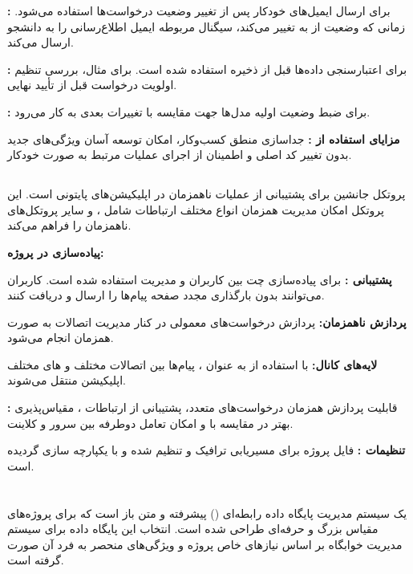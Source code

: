 \documentclass[12pt,a4paper]{report}
\begin{document}
	\textbf{:} برای ارسال ایمیل‌های خودکار پس از تغییر وضعیت درخواست‌ها استفاده می‌شود. زمانی که وضعیت  از  به  تغییر می‌کند، سیگنال مربوطه ایمیل اطلاع‌رسانی را به دانشجو ارسال می‌کند.
	
	\textbf{:} برای اعتبارسنجی داده‌ها قبل از ذخیره استفاده شده است. برای مثال، بررسی تنظیم اولویت درخواست قبل از تأیید نهایی.
	
	\textbf{:} برای ضبط وضعیت اولیه مدل‌ها جهت مقایسه با تغییرات بعدی به کار می‌رود.
	
	\textbf{مزایای استفاده از :} جداسازی منطق کسب‌وکار، امکان توسعه آسان ویژگی‌های جدید بدون تغییر کد اصلی و اطمینان از اجرای عملیات مرتبط به صورت خودکار.
	
	\subsection{}
	 پروتکل جانشین  برای پشتیبانی از عملیات ناهمزمان در اپلیکیشن‌های پایتونی است. این پروتکل امکان مدیریت همزمان انواع مختلف ارتباطات شامل ،  و سایر پروتکل‌های ناهمزمان را فراهم می‌کند.
	
	\textbf{پیاده‌سازی  در پروژه:}
	
	\textbf{پشتیبانی :} برای پیاده‌سازی چت  بین کاربران و مدیریت استفاده شده است. کاربران می‌توانند بدون بارگذاری مجدد صفحه پیام‌ها را ارسال و دریافت کنند.
	
	\textbf{پردازش ناهمزمان:} پردازش درخواست‌های  معمولی در کنار مدیریت اتصالات  به صورت همزمان انجام می‌شود.
	
	\textbf{لایه‌های کانال:} با استفاده از  به عنوان ، پیام‌ها بین اتصالات مختلف  و  های مختلف اپلیکیشن منتقل می‌شوند.
	
	\textbf{:} قابلیت پردازش همزمان درخواست‌های متعدد، پشتیبانی از ارتباطات ، مقیاس‌پذیری بهتر در مقایسه با  و امکان تعامل دوطرفه بین سرور و کلاینت.
	
	\textbf{تنظیمات :} فایل  پروژه برای مسیریابی ترافیک  و  تنظیم شده و با  یکپارچه سازی گردیده است.
	
	
	\section{}
	 یک سیستم مدیریت پایگاه داده رابطه‌ای () پیشرفته و متن باز است که برای پروژه‌های مقیاس بزرگ و حرفه‌ای طراحی شده است. انتخاب این پایگاه داده برای سیستم مدیریت خوابگاه بر اساس نیازهای خاص پروژه و ویژگی‌های منحصر به فرد آن صورت گرفته است.
	
\end{document}
